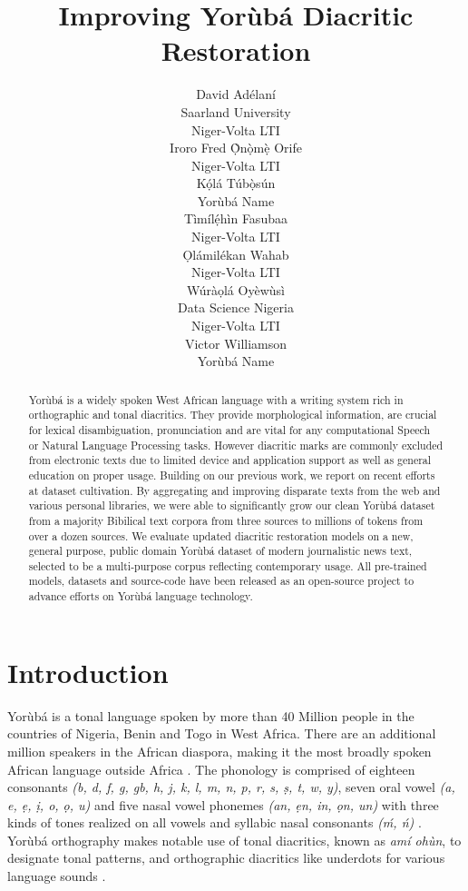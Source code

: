 \documentclass{article} %
\title{Improving Yor{\`u}b{\'a} Diacritic Restoration}
\author{David Ad{\'e}lan{\'i} \\
Saarland University\\
Niger-Volta LTI \\
\And
Iroro Fred \d{\`O}n\d{\`o}m\d{\`e} Orife \\
Niger-Volta LTI\\
\And
K\d{\'{o}}l\'{a} T\'{u}b\d{\`{o}}s\'{u}n \\
Yor{\`u}b{\'a} Name \\
\And
T{\`i}m{\'i}l\d{\'{e}}h{\`i}n Fasubaa \\
Niger-Volta LTI \\
\And
\d{O}l{\'a}mil{\'e}kan Wahab \\
Niger-Volta LTI \\
\And
W{\'u}r{\`a}\d{o}l{\'a} Oy{\`e}w{\`u}s{\`i} \\
Data Science Nigeria \\
Niger-Volta LTI \\
\And
Victor Williamson \\
Yor{\`u}b{\'a} Name \\
}
\begin{document}
\maketitle

\begin{abstract}
Yor{\`u}b{\'a} is a widely spoken West African language with a writing system rich in orthographic and tonal diacritics. They provide morphological information, are crucial for lexical disambiguation, pronunciation and are vital for any computational Speech or Natural Language Processing  tasks. However diacritic marks are commonly excluded from electronic texts due to limited device and application support as well as general education on proper usage. Building on our previous work, we report on recent efforts at dataset cultivation. By aggregating and improving disparate texts from the web and various personal libraries, we were able to significantly grow our clean Yor{\`u}b{\'a} dataset from a majority Bibilical text corpora from three sources to millions of tokens from over a dozen sources. We evaluate updated diacritic restoration models on a new, general purpose, public domain Yor{\`u}b{\'a} dataset of modern journalistic news text, selected to be a multi-purpose corpus reflecting contemporary usage. All pre-trained models, datasets and source-code have been released as an open-source project to advance efforts on Yor{\`u}b{\'a} language technology.\\
\end{abstract}

\section{Introduction}\label{sec:introduction}

Yor{\`u}b{\'a} is a tonal language spoken by more than 40 Million people in the countries of Nigeria, Benin and Togo in West Africa. There are an additional million speakers in the African diaspora, making it the most broadly spoken African language outside Africa \citep{yoruba_language}. The phonology is comprised of eighteen consonants \emph{({b}, {d}, {f}, {g}, {gb}, {h}, {j}, {k}, {l}, {m}, {n}, {p}, {r}, {s}, \d{s}, {t}, {w}, y)}, seven oral vowel \emph{({a}, {e}, \d{e}, \d{i}, {o}, \d{o}, {u})} and five nasal vowel phonemes \emph{({an}, \d{e}{n}, {in}, \d{o}{n}, {un})} with three kinds of tones realized on all vowels and syllabic nasal consonants \emph{({\'m}, {\'n})} \citep{akinlabi2004sound}. Yor{\`u}b{\'a} orthography makes notable use of tonal diacritics, known as \emph{am{\'i} oh{\`u}n}, to designate tonal patterns, and orthographic diacritics like underdots for various language sounds \citep{adegbola2012quantifying, wells2000orthographic}.
\end{document}
